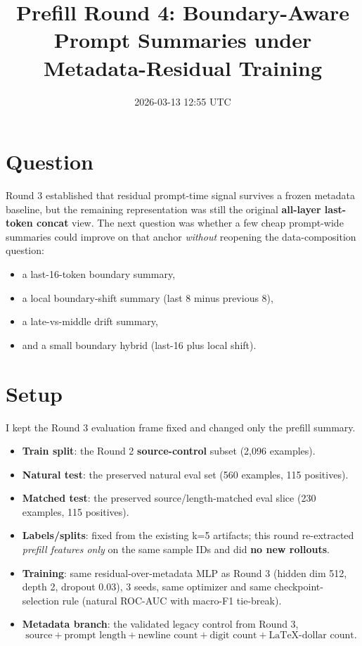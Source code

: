 \documentclass[11pt]{article}
\title{Prefill Round 4: Boundary-Aware Prompt Summaries under Metadata-Residual Training}
\author{}
\date{2026-03-13 12:55 UTC}
\begin{document}
\maketitle

\section*{Question}
Round 3 established that residual prompt-time signal survives a frozen metadata baseline, but the remaining representation was still the original \textbf{all-layer last-token concat} view. The next question was whether a few cheap prompt-wide summaries could improve on that anchor \emph{without} reopening the data-composition question:
\begin{itemize}
  \item a last-16-token boundary summary,
  \item a local boundary-shift summary (last 8 minus previous 8),
  \item a late-vs-middle drift summary,
  \item and a small boundary hybrid (last-16 plus local shift).
\end{itemize}

\section*{Setup}
I kept the Round 3 evaluation frame fixed and changed only the prefill summary.

\begin{itemize}
  \item \textbf{Train split}: the Round 2 \textbf{source-control} subset (2{,}096 examples).
  \item \textbf{Natural test}: the preserved natural eval set (560 examples, 115 positives).
  \item \textbf{Matched test}: the preserved source/length-matched eval slice (230 examples, 115 positives).
  \item \textbf{Labels/splits}: fixed from the existing k=5 artifacts; this round re-extracted \emph{prefill features only} on the same sample IDs and did \textbf{no new rollouts}.
  \item \textbf{Training}: same residual-over-metadata MLP as Round 3 (hidden dim 512, depth 2, dropout 0.03), 3 seeds, same optimizer and same checkpoint-selection rule (natural ROC-AUC with macro-F1 tie-break).
  \item \textbf{Metadata branch}: the validated legacy control from Round 3,
  \[
    \text{source} + \text{prompt length} + \text{newline count} + \text{digit count} + \text{LaTeX-dollar count}.
  \]
\end{itemize}
\end{document}
